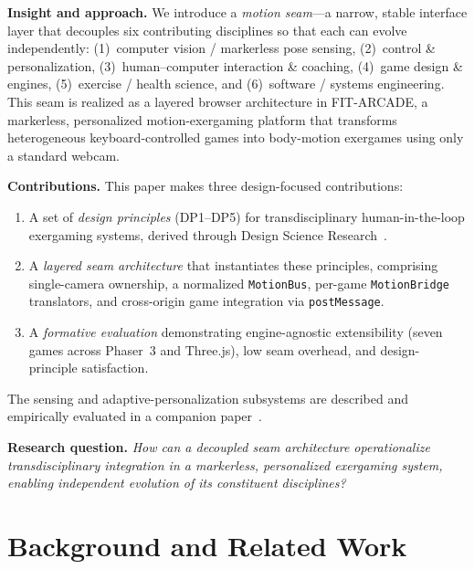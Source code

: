 \documentclass[runningheads]{llncs}
\newcommand{\sys}{\textsc{FIT-ARCADE}}
\newcommand{\motionbus}{\texttt{MotionBus}}
\newcommand{\motionbridge}{\texttt{MotionBridge}}
\newcommand{\postmsg}{\texttt{postMessage}}
\newcommand{\citecompanion}{\cite{companion2026}}
\begin{document}
\textbf{Insight and approach.} We introduce a \emph{motion seam}---a narrow, stable
interface layer that decouples six contributing disciplines so that each can evolve
independently: (1)~computer vision / markerless pose sensing, (2)~control \&
personalization, (3)~human--computer interaction \& coaching, (4)~game design \&
engines, (5)~exercise / health science, and (6)~software / systems engineering.
This seam is realized as a layered browser architecture in \sys{}, a
markerless, personalized motion-exergaming platform that transforms heterogeneous
keyboard-controlled games into body-motion exergames using only a standard webcam.

\textbf{Contributions.} This paper makes three design-focused contributions:
\begin{enumerate}
  \item A set of \emph{design principles} (DP1--DP5) for transdisciplinary
        human-in-the-loop exergaming systems, derived through Design Science
        Research~\cite{hevner2004dsr}.
  \item A \emph{layered seam architecture} that instantiates these principles,
        comprising single-camera ownership, a normalized \motionbus{}, per-game
        \motionbridge{} translators, and cross-origin game integration via
        \postmsg{}.
  \item A \emph{formative evaluation} demonstrating engine-agnostic extensibility
        (seven games across Phaser~3 and Three.js), low seam overhead, and
        design-principle satisfaction.
\end{enumerate}

\noindent The sensing and adaptive-personalization subsystems are described and
empirically evaluated in a companion paper~\citecompanion{}.

\textbf{Research question.} \emph{How can a decoupled seam architecture
operationalize transdisciplinary integration in a markerless, personalized
exergaming system, enabling independent evolution of its constituent disciplines?}

\section{Background and Related Work}
\label{sec:related}
\end{document}
